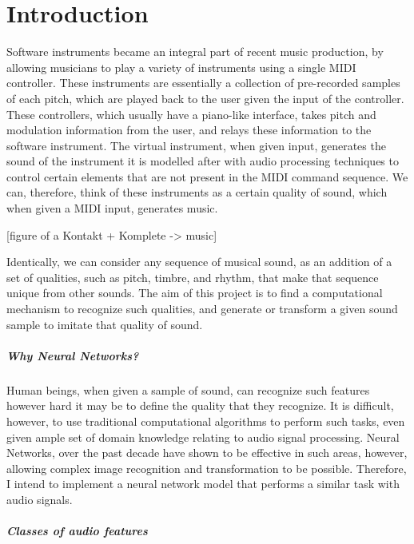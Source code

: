 \documentclass[12pt,a4paper,]{report}
\date{}
\begin{document}
\hypertarget{introduction}{%
\chapter{Introduction}\label{introduction}}

Software instruments became an integral part of recent music production,
by allowing musicians to play a variety of instruments using a single
MIDI controller. These instruments are essentially a collection of
pre-recorded samples of each pitch, which are played back to the user
given the input of the controller. These controllers, which usually have
a piano-like interface, takes pitch and modulation information from the
user, and relays these information to the software instrument. The
virtual instrument, when given input, generates the sound of the
instrument it is modelled after with audio processing techniques to
control certain elements that are not present in the MIDI command
sequence. We can, therefore, think of these instruments as a certain
quality of sound, which when given a MIDI input, generates music.

{[}figure of a Kontakt + Komplete -\textgreater{} music{]}

Identically, we can consider any sequence of musical sound, as an
addition of a set of qualities, such as pitch, timbre, and rhythm, that
make that sequence unique from other sounds. The aim of this project is
to find a computational mechanism to recognize such qualities, and
generate or transform a given sound sample to imitate that quality of
sound.

\paragraph{Why Neural Networks?}

Human beings, when given a sample of sound, can recognize such features
however hard it may be to define the quality that they recognize. It is
difficult, however, to use traditional computational algorithms to
perform such tasks, even given ample set of domain knowledge relating to
audio signal processing. Neural Networks, over the past decade have
shown to be effective in such areas, however, allowing complex image
recognition and transformation to be possible. Therefore, I intend to
implement a neural network model that performs a similar task with audio
signals.

\paragraph{Classes of audio features}
\end{document}
